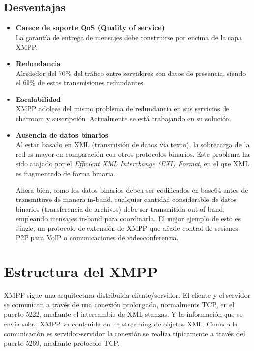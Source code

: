 \documentclass[a4paper, 11pt]{article} %
\begin{document}
   \subsection{Desventajas}
   \begin{itemize}
    \item \textbf{Carece de soporte QoS (Quality of service)}\\
    La garantía de entrega de mensajes debe construirse por encima de la capa XMPP.
    \item \textbf{Redundancia}\\
    Alrededor del 70\% del tráfico entre servidores son datos de presencia, siendo el 60\% de estos transmisiones 
    redundantes.
    \item \textbf{Escalabilidad}\\
    XMPP adolece del mismo problema de redundancia en sus servicios de chatroom y suscripción. Actualmente se está
    trabajando en su solución.
    \item \textbf{Ausencia de datos binarios}\\
    Al estar basado en XML (transmisión de datos vía texto), la sobrecarga de la red es mayor en comparación 
    con otros protocolos binarios. Este problema ha sido atajado por el \textit{Efficient XML Interchange (EXI) Format},
    en el que XML es fragmentado de forma binaria.
    
    Ahora bien, como los datos binarios deben ser codificados en base64 antes de transmitirse de manera in-band,
    cualquier cantidad considerable de datos binarios (transferencia de archivos) debe ser transmitida out-of-band,
    empleando mensajes in-band para coordinarla. El mejor ejemplo de esto es Jingle, un protocolo de extensión de XMPP
    que añade control de sesiones P2P para VoIP o comunicaciones de videoconferencia.
    
   \end{itemize}


\section{Estructura del XMPP}
  XMPP sigue una arquitectura distribuida cliente/servidor. El cliente y el servidor se comunican a través 
  de una conexión prolongada, normalmente TCP, en el puerto 5222, mediante el intercambio de XML stanzas. Y la información 
  que se envía sobre XMPP va contenida en un streaming de objetos XML. Cuando la comunicación es servidor-servidor la 
  conexión se realiza típicamente a través del puerto 5269, mediante protocolo TCP.  
  
\end{document}

